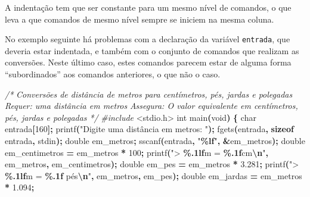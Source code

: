 \documentclass[
  11pt,
  a4paper,
]{scrbook}
\newenvironment{Shaded}{\begin{snugshade}}{\end{snugshade}}
\newcommand{\CommentTok}[1]{\textcolor[rgb]{0.56,0.35,0.01}{\textit{#1}}}
\newcommand{\DataTypeTok}[1]{\textcolor[rgb]{0.13,0.29,0.53}{#1}}
\newcommand{\DecValTok}[1]{\textcolor[rgb]{0.00,0.00,0.81}{#1}}
\newcommand{\FloatTok}[1]{\textcolor[rgb]{0.00,0.00,0.81}{#1}}
\newcommand{\ImportTok}[1]{#1}
\newcommand{\KeywordTok}[1]{\textcolor[rgb]{0.13,0.29,0.53}{\textbf{#1}}}
\newcommand{\NormalTok}[1]{#1}
\newcommand{\OperatorTok}[1]{\textcolor[rgb]{0.81,0.36,0.00}{\textbf{#1}}}
\newcommand{\PreprocessorTok}[1]{\textcolor[rgb]{0.56,0.35,0.01}{\textit{#1}}}
\newcommand{\SpecialCharTok}[1]{\textcolor[rgb]{0.81,0.36,0.00}{\textbf{#1}}}
\newcommand{\StringTok}[1]{\textcolor[rgb]{0.31,0.60,0.02}{#1}}
\begin{document}
A indentação tem que ser constante para um mesmo nível de comandos, o
que leva a que comandos de mesmo nível sempre se iniciem na mesma
coluna.

No exemplo seguinte há problemas com a declaração da variável
\texttt{entrada}, que deveria estar indentada, e também com o conjunto
de comandos que realizam as conversões. Neste último caso, estes
comandos parecem estar de alguma forma ``subordinados'' aos comandos
anteriores, o que não o caso.

\begin{Shaded}
\begin{Highlighting}[]
\CommentTok{/*}
\CommentTok{Conversões de distância de metros para centímetros, pés, jardas e polegadas}
\CommentTok{Requer: uma distância em metros}
\CommentTok{Assegura: O valor equivalente em centímetros, pés, jardas e polegadas}
\CommentTok{*/}
\PreprocessorTok{\#include }\ImportTok{\textless{}stdio.h\textgreater{}}
\DataTypeTok{int}\NormalTok{ main}\OperatorTok{(}\DataTypeTok{void}\OperatorTok{)} \OperatorTok{\{}
\DataTypeTok{char}\NormalTok{ entrada}\OperatorTok{[}\DecValTok{160}\OperatorTok{];}
\NormalTok{    printf}\OperatorTok{(}\StringTok{"Digite uma distância em metros: "}\OperatorTok{);}
\NormalTok{    fgets}\OperatorTok{(}\NormalTok{entrada}\OperatorTok{,} \KeywordTok{sizeof}\NormalTok{ entrada}\OperatorTok{,}\NormalTok{ stdin}\OperatorTok{);}
    \DataTypeTok{double}\NormalTok{ em\_metros}\OperatorTok{;}
\NormalTok{    sscanf}\OperatorTok{(}\NormalTok{entrada}\OperatorTok{,} \StringTok{"}\SpecialCharTok{\%lf}\StringTok{"}\OperatorTok{,} \OperatorTok{\&}\NormalTok{em\_metros}\OperatorTok{);}
        \DataTypeTok{double}\NormalTok{ em\_centimetros }\OperatorTok{=}\NormalTok{ em\_metros }\OperatorTok{*} \DecValTok{100}\OperatorTok{;}
\NormalTok{        printf}\OperatorTok{(}\StringTok{"\textgreater{} }\SpecialCharTok{\%.1lf}\StringTok{m = }\SpecialCharTok{\%.1f}\StringTok{cm}\SpecialCharTok{\textbackslash{}n}\StringTok{"}\OperatorTok{,}\NormalTok{ em\_metros}\OperatorTok{,}\NormalTok{ em\_centimetros}\OperatorTok{);}
        \DataTypeTok{double}\NormalTok{ em\_pes }\OperatorTok{=}\NormalTok{ em\_metros }\OperatorTok{*} \FloatTok{3.281}\OperatorTok{;}
\NormalTok{        printf}\OperatorTok{(}\StringTok{"\textgreater{} }\SpecialCharTok{\%.1lf}\StringTok{m = }\SpecialCharTok{\%.1f}\StringTok{ pés}\SpecialCharTok{\textbackslash{}n}\StringTok{"}\OperatorTok{,}\NormalTok{ em\_metros}\OperatorTok{,}\NormalTok{ em\_pes}\OperatorTok{);}
        \DataTypeTok{double}\NormalTok{ em\_jardas }\OperatorTok{=}\NormalTok{ em\_metros }\OperatorTok{*} \FloatTok{1.094}\OperatorTok{;}

\end{Highlighting}
\end{Shaded}
\end{document}
